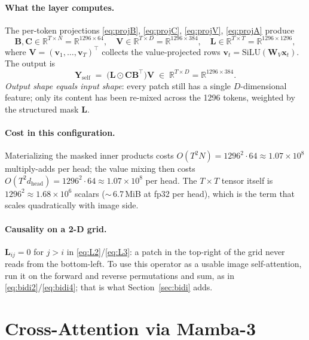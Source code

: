\documentclass[11pt,a4paper]{article}
\begin{document}
\paragraph{What the layer computes.}
The per-token projections \eqref{eq:projB}, \eqref{eq:projC},
\eqref{eq:projV}, \eqref{eq:projA} produce
\begin{equation}
  \bm{B},\bm{C}\in\mathbb{R}^{T\times N}=\mathbb{R}^{1296\times 64},
  \quad
  \bm{V}\in\mathbb{R}^{T\times D}=\mathbb{R}^{1296\times 384},
  \quad
  \bm{L}\in\mathbb{R}^{T\times T}=\mathbb{R}^{1296\times 1296},
\end{equation}
where $\bm{V} = (\bm{v}_1,\dots,\bm{v}_T)^\top$ collects the
value-projected rows $\bm{v}_t = \mathrm{SiLU}(\bm{W}_V\bm{x}_t)$.
The output is
\begin{equation}
  \bm{Y}_{\text{self}}
   \;=\; \bigl(\bm{L}\odot\bm{C}\bm{B}^\top\bigr)\bm{V}
   \;\in\;\mathbb{R}^{T\times D}=\mathbb{R}^{1296\times 384}.
\end{equation}
\emph{Output shape equals input shape}: every patch still has a single
$D$-dimensional feature; only its content has been re-mixed across the
1296 tokens, weighted by the structured mask $\bm{L}$.

\paragraph{Cost in this configuration.}
Materializing the masked inner products costs $O(T^{2}N) =
1296^{2}\cdot 64 \approx 1.07\!\times\!10^{8}$ multiply-adds per head;
the value mixing then costs $O(T^{2}d_{\text{head}}) =
1296^{2}\cdot 64 \approx 1.07\!\times\!10^{8}$ per head. The $T\times
T$ tensor itself is $1296^{2}\approx 1.68\!\times\!10^{6}$ scalars
($\sim$\,6.7\,MiB at fp32 per head), which is the term that scales
quadratically with image side.

\paragraph{Causality on a 2-D grid.}
$\bm{L}_{ij}=0$ for $j>i$ in \eqref{eq:L2}/\eqref{eq:L3}: a patch in
the top-right of the grid never reads from the bottom-left. To use
this operator as a usable image self-attention, run it on the forward
and reverse permutations and sum, as in
\eqref{eq:bidi2}/\eqref{eq:bidi4}; that is what
Section~\ref{sec:bidi} adds.

\section{Cross-Attention via Mamba-3}
\label{sec:cross}
\end{document}
